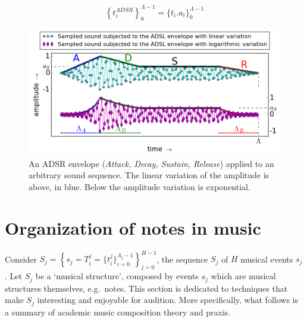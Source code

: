 \begin{equation}\label{eq:adsrApl}
\left\{t_i^{ADSR}\right\}_0^{\Lambda-1} =\{t_i . a_i\}_0^{\Lambda-1}
\end{equation}

\begin{figure}[htp!]
    \centering
        \includegraphics[width=\columnwidth]{figures/adsr_}
    \caption{An ADSR envelope (\emph{Attack, Decay, Sustain, Release}) applied to an arbitrary sound sequence. The linear variation of the amplitude is above, in blue. Below the amplitude variation is exponential.}
        \label{fig:adsr}
\end{figure}





\section{Organization of notes in music}\label{notasMusica} \label{sec:notesMusic}
Consider $S_j=\left\{  s_j=T_i^j=\{t_i^j\}_{i=0}^{\Lambda_j-1} \right\}_{j=0}^{H-1}$, the sequence $S_j$ of $H$ musical events $s_j$. Let $S_j$ be a `musical structure', composed by events $s_j$ which are musical structures themselves, e.g.\ notes. This section is dedicated to techniques that make $S_j$ interesting and enjoyable for audition. More specifically, what follows is a summary of academic music composition theory and praxis.

